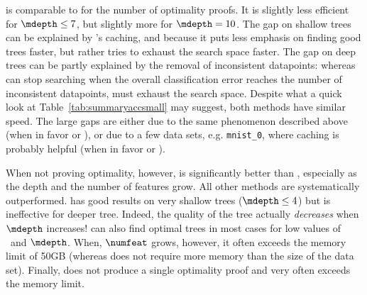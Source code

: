 \documentclass{article}
\begin{document}
\budalg is comparable to \murtree for the number of optimality proofs.
It is slightly less efficient for  $\mdepth \leq 7$, but slightly more for $\mdepth = 10$. The gap on shallow trees can be explained by \murtree's caching, and because it puts less emphasis on finding good trees faster, but rather tries to exhaust the search space faster. The gap on deep trees can be partly explained by the removal of inconsistent datapoints: whereas \budalg can stop searching when the overall classification error reaches the number of inconsistent datapoints, \murtree must exhaust the search space. Despite what a quick look at Table~\ref{tab:summaryaccsmall} may suggest, both methods have similar speed. The large gaps are either due to the same phenomenon described above (when in favor or \budalg), or due to a few data sets, e.g. \texttt{mnist\_0}, where caching is probably helpful (when in favor or \murtree).

When not proving optimality, however, \budalg is significantly better than \murtree, especially as the depth and the number of features grow.
All other methods are systematically outperformed. \cp has good results on very shallow trees ($\mdepth \leq 4$) but is ineffective for deeper tree. Indeed, the quality of the tree actually \emph{decreases} when $\mdepth$ increases! \dleight can also find optimal trees in most cases 
for low values of \numfeat\ and $\mdepth$.
When, $\numfeat$ grows, however, it often exceeds the memory limit of 50GB (whereas \budalg does not require more memory than the size of the data set). Finally, \binoct does not produce a single optimality proof and very often exceeds the memory limit.%
 

\end{document}
